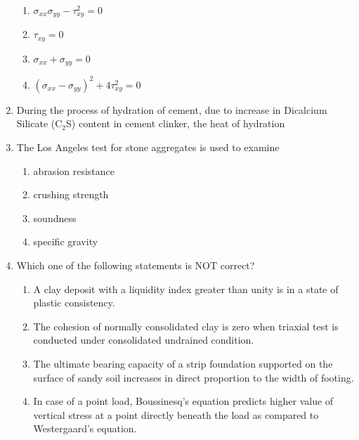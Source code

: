\documentclass[journal]{IEEEtran}
\begin{document}
\begin{enumerate}
\begin{enumerate}

\item $\sigma_{xx}\sigma_{yy} - \tau_{xy}^{2} = 0$  
\item $\tau_{xy} = 0$  
\item $\sigma_{xx} + \sigma_{yy} = 0$  
\item $(\sigma_{xx} - \sigma_{yy})^{2} + 4\tau_{xy}^{2} = 0$  

\end{enumerate}

\item During the process of hydration of cement, due to increase in Dicalcium Silicate (C$_2$S) content in cement clinker, the heat of hydration \hfill {}

\begin{enumerate}
\end{enumerate}

\item The Los Angeles test for stone aggregates is used to examine \hfill {}

\begin{enumerate}

\item abrasion resistance  
\item crushing strength  
\item soundness  
\item specific gravity  

\end{enumerate}

\item Which one of the following statements is NOT correct? \hfill {}

\begin{enumerate}

\item A clay deposit with a liquidity index greater than unity is in a state of plastic consistency.  
\item The cohesion of normally consolidated clay is zero when triaxial test is conducted under consolidated undrained condition.  
\item The ultimate bearing capacity of a strip foundation supported on the surface of sandy soil increases in direct proportion to the width of footing.  
\item In case of a point load, Boussinesq's equation predicts higher value of vertical stress at a point directly beneath the load as compared to Westergaard's equation.  


\end{enumerate}
\end{enumerate}
\end{document}

